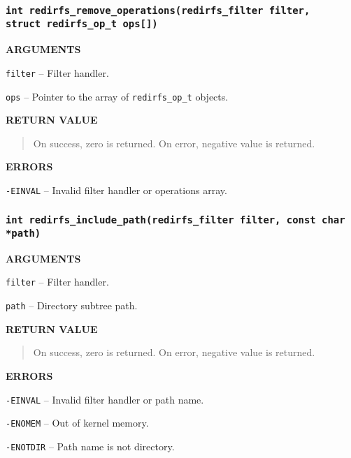 \subsubsection{\texttt{int redirfs\_remove\_operations(redirfs\_filter filter,\\
struct redirfs\_op\_t ops[])}}
\begin{list}{}{}
	\item \textbf{ARGUMENTS}
		\begin{list}{}{}
			\item \texttt{filter} -- Filter handler.
			\item \texttt{ops} -- Pointer to the array of
				\texttt{redirfs\_op\_t} objects.
		\end{list}
	\item \textbf{RETURN VALUE}
		\begin{quotation}
			\noindent On success, zero is returned. On error, negative
			value is returned.
		\end{quotation}
	\item \textbf{ERRORS}
		\begin{list}{}{}
			\item \texttt{-EINVAL} -- Invalid filter handler or operations
				array.
		\end{list}
\end{list}

\subsubsection{\texttt{int redirfs\_include\_path(redirfs\_filter filter, const char *path)}}
\begin{list}{}{}
	\item \textbf{ARGUMENTS}
		\begin{list}{}{}
			\item \texttt{filter} -- Filter handler.
			\item \texttt{path} -- Directory subtree path.
		\end{list}
	\item \textbf{RETURN VALUE}
		\begin{quotation}
			\noindent On success, zero is returned. On error, negative
			value is returned.
		\end{quotation}
	\item \textbf{ERRORS}
		\begin{list}{}{}
			\item \texttt{-EINVAL} -- Invalid filter handler or path name.
			\item \texttt{-ENOMEM} -- Out of kernel memory.
			\item \texttt{-ENOTDIR} -- Path name is not directory.
		\end{list}
\end{list}

